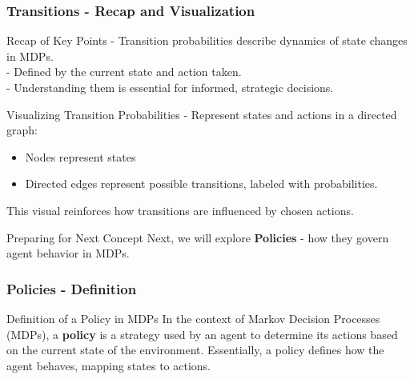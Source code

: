 \documentclass{beamer}
\begin{document}
\begin{frame}[fragile]
    \frametitle{Transitions - Recap and Visualization}

    \begin{block}{Recap of Key Points}
        - Transition probabilities describe dynamics of state changes in MDPs.\\
        - Defined by the current state and action taken.\\
        - Understanding them is essential for informed, strategic decisions.
    \end{block}

    \begin{block}{Visualizing Transition Probabilities}
        - Represent states and actions in a directed graph:
        \begin{itemize}
            \item Nodes represent states
            \item Directed edges represent possible transitions, labeled with probabilities.
        \end{itemize}
        This visual reinforces how transitions are influenced by chosen actions.
    \end{block}

    \begin{block}{Preparing for Next Concept}
        Next, we will explore \textbf{Policies} - how they govern agent behavior in MDPs.
    \end{block}
\end{frame}

\begin{frame}[fragile]
    \frametitle{Policies - Definition}
    \begin{block}{Definition of a Policy in MDPs}
        In the context of Markov Decision Processes (MDPs), a \textbf{policy} is a strategy used by an agent to determine its actions based on the current state of the environment. Essentially, a policy defines how the agent behaves, mapping states to actions.
    \end{block}
\end{frame}
\end{document}
